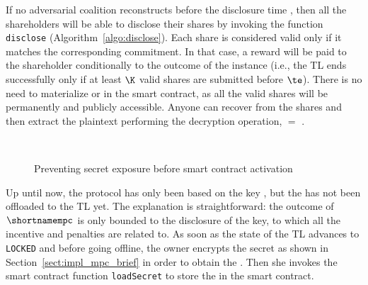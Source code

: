 If no adversarial coalition reconstructs \key before the disclosure time \td, then all the shareholders will be able to disclose their shares by invoking the function \texttt{disclose} (Algorithm~\ref{algo:disclose}).
Each share is considered valid only if it matches the corresponding commitment.
In that case, a reward will be paid to the shareholder conditionally to the outcome of the instance (i.e., the TL ends successfully only if at least $\K$ valid shares are submitted before $\te$).
There is no need to materialize \key or \secret in the smart contract, as all the valid shares will be permanently and publicly accessible. Anyone can recover \key from the shares and then extract the plaintext performing the decryption operation, \secret $=$ \unwrap.

\begin{figure}[t]
	\centering
	\\
	\vspace*{2pt}
	\caption{Preventing secret exposure before smart contract activation}%
	\label{fig:key_delayed_wrap}%
\end{figure}


Up until now, the protocol has only been based on the key \key, but the \secret has not been offloaded to the TL yet.
The explanation is straightforward: the outcome of $\shortnamempc$ is only bounded to the disclosure of the key, to which all the incentive and penalties are related to. 
As soon as the state of the TL advances to \texttt{LOCKED} and before going offline, the owner encrypts the secret \secret as shown in Section~\ref{sect:impl_mpc_brief} in order to obtain the \ciphertext. Then she invokes the smart contract function \texttt{loadSecret} to store the \ciphertext in the smart contract.